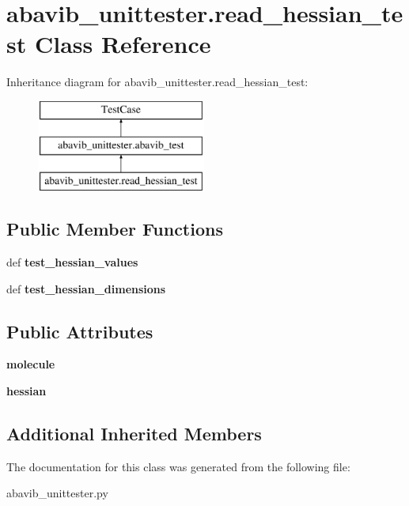 \hypertarget{classabavib__unittester_1_1read__hessian__test}{\section{abavib\+\_\+unittester.\+read\+\_\+hessian\+\_\+test Class Reference}
\label{classabavib__unittester_1_1read__hessian__test}
}
Inheritance diagram for abavib\+\_\+unittester.\+read\+\_\+hessian\+\_\+test\+:\begin{figure}[H]
\begin{center}
\leavevmode
\includegraphics[height=3.000000cm]{classabavib__unittester_1_1read__hessian__test}
\end{center}
\end{figure}
\subsection*{Public Member Functions}
\begin{DoxyCompactItemize}
\item 
\hypertarget{classabavib__unittester_1_1read__hessian__test_aca294204b35ad6feb0161aae379296cc}{def {\bfseries test\+\_\+hessian\+\_\+values}}\label{classabavib__unittester_1_1read__hessian__test_aca294204b35ad6feb0161aae379296cc}

\item 
\hypertarget{classabavib__unittester_1_1read__hessian__test_adee645671ac9fc43398afb66a11d1ddf}{def {\bfseries test\+\_\+hessian\+\_\+dimensions}}\label{classabavib__unittester_1_1read__hessian__test_adee645671ac9fc43398afb66a11d1ddf}

\end{DoxyCompactItemize}
\subsection*{Public Attributes}
\begin{DoxyCompactItemize}
\item 
\hypertarget{classabavib__unittester_1_1read__hessian__test_a41f0724afcbf8189c2615251910aa684}{{\bfseries molecule}}\label{classabavib__unittester_1_1read__hessian__test_a41f0724afcbf8189c2615251910aa684}

\item 
\hypertarget{classabavib__unittester_1_1read__hessian__test_af67af78bb936974d10272d206c11c8ed}{{\bfseries hessian}}\label{classabavib__unittester_1_1read__hessian__test_af67af78bb936974d10272d206c11c8ed}

\end{DoxyCompactItemize}
\subsection*{Additional Inherited Members}


The documentation for this class was generated from the following file\+:\begin{DoxyCompactItemize}
\item 
abavib\+\_\+unittester.\+py\end{DoxyCompactItemize}
